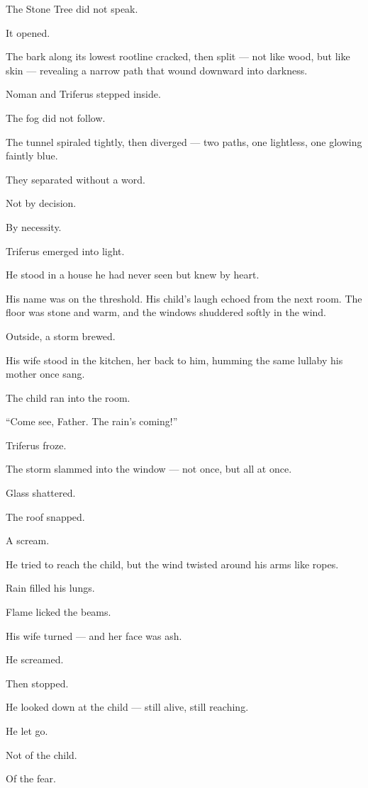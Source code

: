 \documentclass[12pt]{article}
\begin{document}
The Stone Tree did not speak.

It opened.

The bark along its lowest rootline cracked, then split — not like wood, but like skin — revealing a narrow path that wound downward into darkness.

Noman and Triferus stepped inside.

The fog did not follow.

\bigskip

The tunnel spiraled tightly, then diverged — two paths, one lightless, one glowing faintly blue.

They separated without a word.

Not by decision.

By necessity.

\bigskip

Triferus emerged into light.

He stood in a house he had never seen but knew by heart.

His name was on the threshold. His child’s laugh echoed from the next room. The floor was stone and warm, and the windows shuddered softly in the wind.

Outside, a storm brewed.

His wife stood in the kitchen, her back to him, humming the same lullaby his mother once sang.

The child ran into the room.

“Come see, Father. The rain’s coming!”

Triferus froze.

The storm slammed into the window — not once, but all at once.

Glass shattered.

The roof snapped.

A scream.

He tried to reach the child, but the wind twisted around his arms like ropes.

Rain filled his lungs.

Flame licked the beams.

His wife turned — and her face was ash.

He screamed.

Then stopped.

He looked down at the child — still alive, still reaching.

He let go.

Not of the child.

Of the fear.
\end{document}
